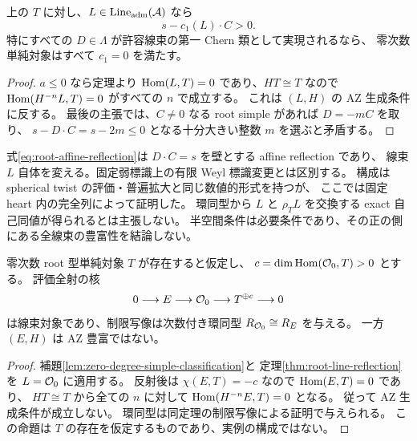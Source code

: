 \begin{corollary}\label{cor:admissible-root-halfspace}
上の $T$ に対し、$L\in\operatorname{Line}_{\rm adm}(\mathcal A)$ なら
\[
 s-c_1(L)\cdot C>0.
\]
特にすべての $D\in\Lambda$ が許容線束の第一 Chern 類として実現されるなら、
零次数単純対象はすべて $c_1=0$ を満たす。
\end{corollary}
\begin{proof}
$a\le0$ なら定理より $\operatorname{Hom}(L,T)=0$ であり、$HT\cong T$ なので
$\operatorname{Hom}(H^{-n}L,T)=0$ がすべての $n$ で成立する。
これは $(L,H)$ の AZ 生成条件に反する。
最後の主張では、$C\ne0$ なる root simple があれば $D=-mC$ を取り、
$s-D\cdot C=s-2m\le0$ となる十分大きい整数 $m$ を選ぶと矛盾する。
\end{proof}

\begin{remark}
式\eqref{eq:root-affine-reflection}は $D\cdot C=s$ を壁とする affine reflection であり、
線束 $L$ 自体を変える。固定弱標識上の有限 Weyl 標識変更とは区別する。
構成は spherical twist の評価・普遍拡大と同じ数値的形式を持つが、
ここでは固定 heart 内の完全列によって証明した。
環同型から $L$ と $\rho_TL$ を交換する exact 自己同値が得られるとは主張しない。
半空間条件は必要条件であり、その正の側にある全線束の豊富性を結論しない。
\end{remark}

\begin{proposition}[同じ切断環を持つ非許容線束]\label{prop:root-simple-obstruction}
零次数 root 型単純対象 $T$ が存在すると仮定し、
$c=\dim\operatorname{Hom}(\mathcal O_0,T)>0$ とする。
評価全射の核
\[
 0\longrightarrow E\longrightarrow\mathcal O_0\longrightarrow T^{\oplus c}
 \longrightarrow0
\]
は線束対象であり、制限写像は次数付き環同型 $R_{\mathcal O_0}\cong R_E$ を与える。
一方 $(E,H)$ は AZ 豊富ではない。
\end{proposition}
\begin{proof}
補題\ref{lem:zero-degree-simple-classification}と
定理\ref{thm:root-line-reflection}を $L=\mathcal O_0$ に適用する。
反射後は $\chi(E,T)=-c$ なので $\operatorname{Hom}(E,T)=0$ であり、
$HT\cong T$ から全ての $n$ に対して $\operatorname{Hom}(H^{-n}E,T)=0$ となる。
従って AZ 生成条件が成立しない。
環同型は同定理の制限写像による証明で与えられる。
この命題は $T$ の存在を仮定するものであり、実例の構成ではない。
\end{proof}


